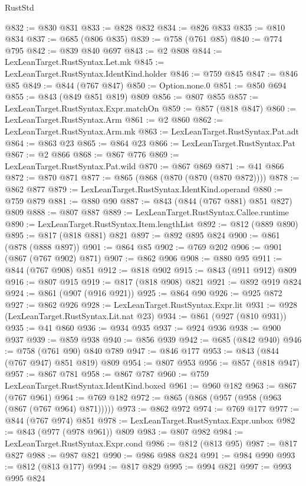 \begin{lexlean}{RustStd}
\begin{coremodule}
@832 := @830 @831
@833 := @828 @832
@834 := @826 @833
@835 := @810 @834
@837 := @685 (@806 @835)
@839 := @758 (@761 @85)
@840 := @774 @795
@842 := @839 @840 @697
@843 := @2 @808
@844 := LexLeanTarget.RustSyntax.Let.mk
@845 := LexLeanTarget.RustSyntax.IdentKind.holder
@846 := @759 @845
@847 := @846 @85
@849 := @844 (@767 @847)
@850 := Option.none.{0}
@851 := @850 @694
@855 := @843 (@849 @851 @819) @809
@856 := @807 @855
@857 := LexLeanTarget.RustSyntax.Expr.matchOn
@859 := @857 (@818 @847)
@860 := LexLeanTarget.RustSyntax.Arm
@861 := @2 @860
@862 := LexLeanTarget.RustSyntax.Arm.mk
@863 := LexLeanTarget.RustSyntax.Pat.adt
@864 := @863 @23
@865 := @864 @23
@866 := LexLeanTarget.RustSyntax.Pat
@867 := @2 @866
@868 := @867 @776
@869 := LexLeanTarget.RustSyntax.Pat.wild
@870 := @867 @869
@871 := @41 @866
@872 := @870 @871
@877 := @865 (@868 (@870 (@870 (@870 @872))))
@878 := @862 @877
@879 := LexLeanTarget.RustSyntax.IdentKind.operand
@880 := @759 @879
@881 := @880 @90
@887 := @843 (@844 (@767 @881) @851 @827) @809
@888 := @807 @887
@889 := LexLeanTarget.RustSyntax.Callee.runtime
@890 := LexLeanTarget.RustSyntax.Item.lengthList
@892 := @812 (@889 @890)
@895 := @817 (@818 @881) @821
@897 := @892 @895 @824
@900 := @861 (@878 (@888 @897))
@901 := @864 @85
@902 := @769 @202
@906 := @901 (@867 (@767 @902) @871)
@907 := @862 @906
@908 := @880 @95
@911 := @844 (@767 @908) @851
@912 := @818 @902
@915 := @843 (@911 @912) @809
@916 := @807 @915
@919 := @817 (@818 @908) @821
@921 := @892 @919 @824
@924 := @861 (@907 (@916 @921))
@925 := @864 @90
@926 := @925 @872
@927 := @862 @926
@928 := LexLeanTarget.RustSyntax.Expr.lit
@931 := @928 (LexLeanTarget.RustSyntax.Lit.nat @23)
@934 := @861 (@927 (@810 @931))
@935 := @41 @860
@936 := @934 @935
@937 := @924 @936
@938 := @900 @937
@939 := @859 @938
@940 := @856 @939
@942 := @685 (@842 @940)
@946 := @758 (@761 @90) @840 @789
@947 := @846 @177
@953 := @843 (@844 (@767 @947) @851 @819) @809
@954 := @807 @953
@956 := @857 (@818 @947)
@957 := @867 @781
@958 := @867 @787
@960 := @759 LexLeanTarget.RustSyntax.IdentKind.boxed
@961 := @960 @182
@963 := @867 (@767 @961)
@964 := @769 @182
@972 := @865 (@868 (@957 (@958 (@963 (@867 (@767 @964) @871)))))
@973 := @862 @972
@974 := @769 @177
@977 := @844 (@767 @974) @851
@978 := LexLeanTarget.RustSyntax.Expr.unbox
@982 := @843 (@977 (@978 @961)) @809
@983 := @807 @982
@984 := LexLeanTarget.RustSyntax.Expr.cond
@986 := @812 (@813 @95)
@987 := @817 @827
@988 := @987 @821
@990 := @986 @988 @824
@991 := @984 @990
@993 := @812 (@813 @177)
@994 := @817 @829
@995 := @994 @821
@997 := @993 @995 @824

\end{coremodule}
\end{lexlean}

